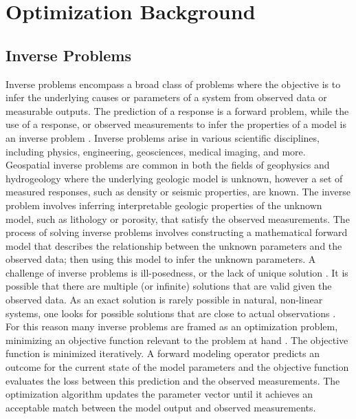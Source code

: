 \FloatBarrier
\section{Optimization Background}
\label{sec:01optreview}

\FloatBarrier
\subsection{Inverse Problems}
\label{subsec:01inverse}

Inverse problems encompass a broad class of problems where the objective is to infer the underlying causes or parameters of a system from observed data or measurable outputs. The prediction of a response is a forward problem, while the use of a response, or observed measurements to infer the properties of a model is an inverse problem \citep{tarantola2005inverse}. Inverse problems arise in various scientific disciplines, including physics, engineering, geosciences, medical imaging, and more. Geospatial inverse problems are common in both the fields of geophysics \citep{linde2015geological} and hydrogeology \citep{zhou2014inverse} where the underlying geologic model is unknown, however a set of measured responses, such as density or seismic properties, are known. The inverse problem involves inferring interpretable geologic properties of the unknown model, such as lithology or porosity, that satisfy the observed measurements. The process of solving inverse problems involves constructing a mathematical forward model that describes the relationship between the unknown parameters and the observed data; then using this model to infer the unknown parameters. A challenge of inverse problems is ill-posedness, or the lack of unique solution \citep{tarantola2005inverse}. It is possible that there are multiple (or infinite) solutions that are valid given the observed data. As an exact solution is rarely possible in natural, non-linear systems, one looks for possible solutions that are close to actual observations \citep{bardossy2016random}. For this reason many inverse problems are framed as an optimization problem, minimizing an objective function relevant to the problem at hand \citep{giraud2019integration,nava-flores2023high,athens2022stochastic}. The objective function is minimized iteratively. A forward modeling operator predicts an outcome for the current state of the model parameters and the objective function evaluates the loss between this prediction and the observed measurements. The optimization algorithm updates the parameter vector until it achieves an acceptable match between the model output and observed measurements.

